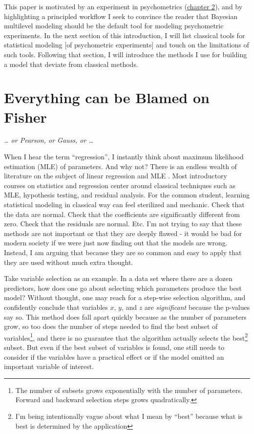 \documentclass[11pt, oneside, openany]{scrbook}
\begin{document}
This paper is motivated by an experiment in psychometrics (\protect\hyperlink{motivating-data}{chapter 2}), and by highlighting a principled workflow I seek to convince the reader that Bayesian multilevel modeling should be the default tool for modeling psychometric experiments. In the next section of this introduction, I will list classical tools for statistical modeling {[}of psychometric experiments{]} and touch on the limitations of such tools. Following that section, I will introduce the methods I use for building a model that deviate from classical methods.

\hypertarget{ch010-classical-methods}{%
\section{Everything can be Blamed on Fisher}\label{ch010-classical-methods}}

\emph{\ldots{} or Pearson, or Gauss, or \ldots{}}

When I hear the term ``regression'', I instantly think about maximum likelihood estimation (MLE) of parameters. And why not? There is an endless wealth of literature on the subject of linear regression and MLE \citep{johnson2002applied, larsen2005introduction, sheather2009modern, navidi2015statistics}. Most introductory courses on statistics and regression center around classical techniques such as MLE, hypothesis testing, and residual analysis. For the common student, learning statistical modeling in classical way can feel sterilized and mechanic. Check that the data are normal. Check that the coefficients are significantly different from zero. Check that the residuals are normal. Etc. I'm not trying to say that these methods are not important or that they are deeply flawed - it would be bad for modern society if we were just now finding out that the models are wrong. Instead, I am arguing that because they are so common and easy to apply that they are used without much extra thought.

Take variable selection as an example. In a data set where there are a dozen predictors, how does one go about selecting which parameters produce the best model? Without thought, one may reach for a step-wise selection algorithm, and confidently conclude that variables \(x\), \(y\), and \(z\) are \emph{significant} because the p-values say so. This method does fall apart quickly because as the number of parameters grow, so too does the number of steps needed to find the best subset of variables\footnote{The number of subsets grows exponentially with the number of parameters. Forward and backward selection steps grows quadratically.}, and there is no guarantee that the algorithm actually selects the best\footnote{I'm being intentionally vague about what I mean by ``best'' because what is best is determined by the application} subset. But even if the best subset of variables is found, one still needs to consider if the variables have a practical effect or if the model omitted an important variable of interest.
\end{document}

